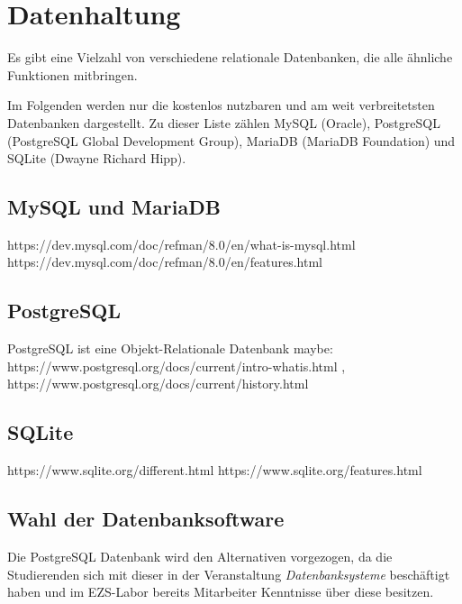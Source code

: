 \section{Datenhaltung} \label{sec:Datenhaltung}
Es gibt eine Vielzahl von verschiedene relationale Datenbanken, die alle ähnliche Funktionen mitbringen.

Im Folgenden werden nur die kostenlos nutzbaren und am weit verbreitetsten Datenbanken dargestellt. Zu dieser Liste zählen MySQL (Oracle), PostgreSQL (PostgreSQL Global Development Group), MariaDB (MariaDB Foundation) und SQLite (Dwayne Richard Hipp). \cite{db-enginesDBEnginesRanking}

\subsection{MySQL und MariaDB}
https://dev.mysql.com/doc/refman/8.0/en/what-is-mysql.html
https://dev.mysql.com/doc/refman/8.0/en/features.html

\subsection{PostgreSQL}
PostgreSQL ist eine Objekt-Relationale Datenbank
maybe: https://www.postgresql.org/docs/current/intro-whatis.html , https://www.postgresql.org/docs/current/history.html

\subsection{SQLite}
https://www.sqlite.org/different.html
https://www.sqlite.org/features.html


\subsection{Wahl der Datenbanksoftware}
Die PostgreSQL Datenbank wird den Alternativen vorgezogen, da die Studierenden sich mit dieser in der Veranstaltung \textit{Datenbanksysteme} beschäftigt haben und im EZS-Labor bereits Mitarbeiter Kenntnisse über diese besitzen.